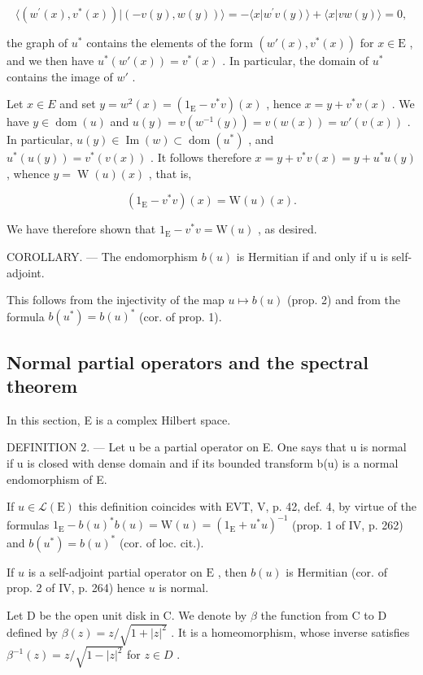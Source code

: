 \[
\langle (w ^ {\prime} (x), v ^ {*} (x)) | (- v (y), w (y)) \rangle = - \langle x | w ^ {\prime} v (y) \rangle + \langle x | v w (y) \rangle = 0,
\]

the graph of \(u^*\) contains the elements of the form \((w'(x), v^*(x))\) for \(x \in \mathrm{E}\) , and we then have \(u^*(w'(x)) = v^*(x)\) . In particular, the domain of \(u^*\) contains the image of \(w'\) .

Let \(x \in E\) and set \(y = w^{2}(x) = (1_{\mathrm{E}} - v^{*}v)(x)\) , hence \(x = y + v^{*}v(x)\) . We have \(y \in \operatorname{dom}(u)\) and \(u(y) = v(w^{-1}(y)) = v(w(x)) = w'(v(x))\) . In particular, \(u(y) \in \operatorname{Im}(w) \subset \operatorname{dom}(u^{*})\) , and \(u^{*}(u(y)) = v^{*}(v(x))\) . It follows therefore \(x = y + v^{*}v(x) = y + u^{*}u(y)\) , whence \(y = \operatorname{W}(u)(x)\) , that is,

\[
(1 _ {\mathrm{E}} - v ^ {*} v) (x) = \mathrm{W} (u) (x).
\]

We have therefore shown that \(1_{\mathrm{E}} - v^{*}v = \mathrm{W}(u)\) , as desired.

COROLLARY. --- The endomorphism \(b(u)\) is Hermitian if and only if u is self-adjoint.

This follows from the injectivity of the map \(u \mapsto b(u)\) (prop. 2) and from the formula \(b(u^{*}) = b(u)^{*}\) (cor. of prop. 1).

\subsection{Normal partial operators and the spectral theorem}

In this section, E is a complex Hilbert space.

DEFINITION 2. --- Let u be a partial operator on E. One says that u is normal if u is closed with dense domain and if its bounded transform b(u) is a normal endomorphism of E.

If \(u \in \mathcal{L}(\mathrm{E})\) this definition coincides with EVT, V, p. 42, def. 4, by virtue of the formulas \(1_{\mathrm{E}} - b(u)^{*}b(u) = \mathrm{W}(u) = (1_{\mathrm{E}} + u^{*}u)^{-1}\) (prop. 1 of IV, p. 262) and \(b(u^{*}) = b(u)^{*}\) (cor. of loc. cit.).

If \(u\) is a self-adjoint partial operator on \(\mathrm{E}\) , then \(b(u)\) is Hermitian (cor. of prop. 2 of IV, p. 264) hence \(u\) is normal.

Let D be the open unit disk in C. We denote by \(\beta\) the function from C to D defined by \(\beta(z)=z/\sqrt{1+|z|^{2}}\) . It is a homeomorphism, whose inverse satisfies \(\beta^{-1}(z)=z/\sqrt{1-|z|^{2}}\) for \(z\in D\) .

